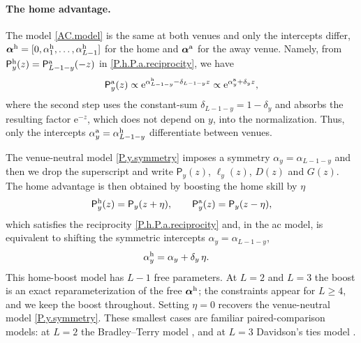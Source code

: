\documentclass[letterpaper,12pt]{article}
\newcommand{\mr}[1]{\mathrm{#1}}
\newcommand{\tnr}[1]{{\textnormal{#1}}}
\newcommand{\mf}[1]{\mathsf{#1}}
\newcommand{\balpha}{\boldsymbol{\alpha}}
\newcommand{\ld}{\ldots}
\newcommand{\e}{\mr{e}}
\newcommand{\mfP}{\mf{P}}
\begin{document}
\paragraph{The home advantage.}
The model \eqref{AC.model} is the same at both venues and only the intercepts differ, $\balpha^\tnr{h}=[0,\alpha^\tnr{h}_1,\ld,\alpha^\tnr{h}_{L-1}]$ for the home and $\balpha^\tnr{a}$ for the away venue. Namely, from $\mfP^\tnr{h}_y(z)=\mfP^\tnr{a}_{L-1-y}(-z)$ in \eqref{P.h.P.a.reciprocity}, we have
\begin{align}
   \mfP^\tnr{a}_y(z) \propto \e^{\alpha^\tnr{h}_{L-1-y}-\delta_{L-1-y} z}\propto \e^{\alpha^\tnr{a}_{y}+\delta_{y} z},\nonumber
\end{align}
where the second step uses the constant-sum $\delta_{L-1-y}=1-\delta_y$ and absorbs the resulting factor $\e^{-z}$, which does not depend on $y$, into the normalization. Thus, only the intercepts $\alpha^\tnr{a}_y=\alpha^\tnr{h}_{L-1-y}$ differentiate between venues.

The venue-neutral model \eqref{P.y.symmetry} imposes a symmetry $\alpha_y = \alpha_{L-1-y}$ \citep[Sec.~3]{Agresti92} and then we drop the superscript and write $\mfP_y(z)$, $\ell_y(z)$, $D(z)$ and $G(z)$. The home advantage is then obtained by boosting the home skill by $\eta$ \citep{Rao67,Davidson77,fifa_rating_W,Lasek20,Szczecinski22a}
\begin{align}
\label{P.h.a.from.P}
    \mfP^\tnr{h}_y(z)=\mfP_y(z+\eta),\qquad \mfP^\tnr{a}_y(z)=\mfP_y(z-\eta),
\end{align}
which satisfies the reciprocity \eqref{P.h.P.a.reciprocity} and, in the \gls{ac} model, is equivalent to shifting the symmetric intercepts $\alpha_y=\alpha_{L-1-y}$,
\begin{align}
\label{alpha.sym->alpha}
	\alpha^\tnr{h}_y &= \alpha_y + \delta_y\,\eta.
\end{align}
This home-boost model has $L-1$ free parameters. At $L=2$ and $L=3$ the boost is an exact reparameterization of the free $\balpha^\tnr{h}$; the constraints appear for $L\ge4$, and we keep the boost throughout. Setting $\eta=0$ recovers the venue-neutral model \eqref{P.y.symmetry}. These smallest cases are familiar paired-comparison models: at $L=2$ the Bradley--Terry model \citep{Bradley52}, and at $L=3$ Davidson's ties model \citep{Davidson70}.
\end{document}
